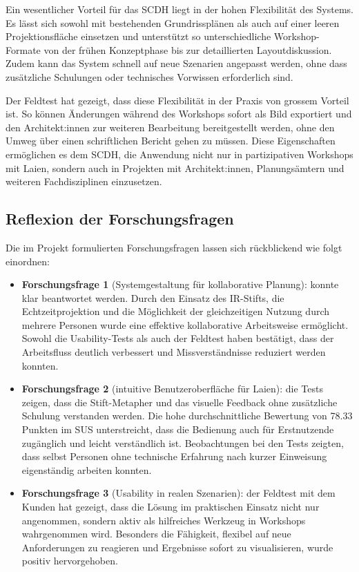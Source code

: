 Ein wesentlicher Vorteil für das SCDH liegt in der hohen Flexibilität des Systems.  
Es lässt sich sowohl mit bestehenden Grundrissplänen als auch auf einer leeren Projektionsfläche einsetzen und unterstützt so unterschiedliche Workshop-Formate von der frühen Konzeptphase bis zur detaillierten Layoutdiskussion.  
Zudem kann das System schnell auf neue Szenarien angepasst werden, ohne dass zusätzliche Schulungen oder technisches Vorwissen erforderlich sind.  

Der Feldtest hat gezeigt, dass diese Flexibilität in der Praxis von grossem Vorteil ist.  
So können Änderungen während des Workshops sofort als Bild exportiert und den Architekt:innen zur weiteren Bearbeitung bereitgestellt werden, ohne den Umweg über einen schriftlichen Bericht gehen zu müssen.  
Diese Eigenschaften ermöglichen es dem SCDH, die Anwendung nicht nur in partizipativen Workshops mit Laien, sondern auch in Projekten mit Architekt:innen, Planungsämtern und weiteren Fachdisziplinen einzusetzen.

\clearpage

\subsection{Reflexion der Forschungsfragen}

Die im Projekt formulierten Forschungsfragen lassen sich rückblickend wie folgt einordnen:

\begin{itemize}
    \item \textbf{Forschungsfrage 1} (Systemgestaltung für kollaborative Planung): konnte klar beantwortet werden. Durch den Einsatz des IR-Stifts, die Echtzeitprojektion und die Möglichkeit der gleichzeitigen Nutzung durch mehrere Personen wurde eine effektive kollaborative Arbeitsweise ermöglicht. Sowohl die Usability-Tests als auch der Feldtest haben bestätigt, dass der Arbeitsfluss deutlich verbessert und Missverständnisse reduziert werden konnten.

    
    \item \textbf{Forschungsfrage 2} (intuitive Benutzeroberfläche für Laien): die Tests zeigen, dass die Stift-Metapher und das visuelle Feedback ohne zusätzliche Schulung verstanden werden. Die hohe durchschnittliche Bewertung von 78.33 Punkten im SUS unterstreicht, dass die Bedienung auch für Erstnutzende zugänglich und leicht verständlich ist. Beobachtungen bei den Tests zeigten, dass selbst Personen ohne technische Erfahrung nach kurzer Einweisung eigenständig arbeiten konnten.
    
    \item \textbf{Forschungsfrage 3} (Usability in realen Szenarien): der Feldtest mit dem Kunden hat gezeigt, dass die Lösung im praktischen Einsatz nicht nur angenommen, sondern aktiv als hilfreiches Werkzeug in Workshops wahrgenommen wird. Besonders die Fähigkeit, flexibel auf neue Anforderungen zu reagieren und Ergebnisse sofort zu visualisieren, wurde positiv hervorgehoben.
\end{itemize}


